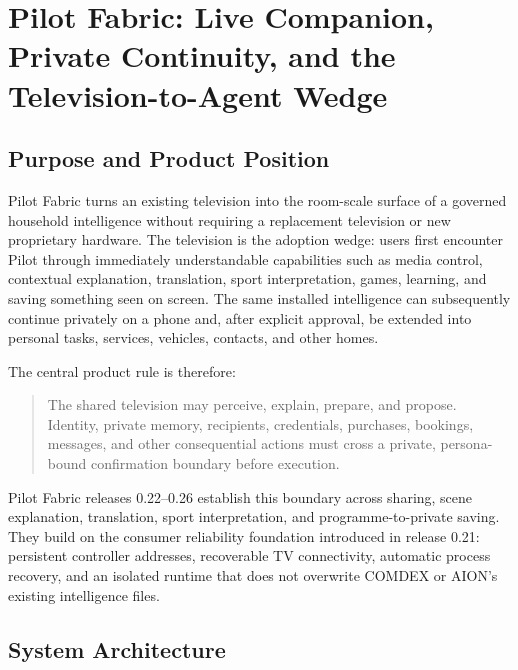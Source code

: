 
\section{Pilot Fabric: Live Companion, Private Continuity, and the Television-to-Agent Wedge}
\label{sec:pilot-live-companion-private-continuity}

\subsection{Purpose and Product Position}

Pilot Fabric turns an existing television into the room-scale surface of a
governed household intelligence without requiring a replacement television or
new proprietary hardware.  The television is the adoption wedge: users first
encounter Pilot through immediately understandable capabilities such as media
control, contextual explanation, translation, sport interpretation, games,
learning, and saving something seen on screen.  The same installed intelligence
can subsequently continue privately on a phone and, after explicit approval,
be extended into personal tasks, services, vehicles, contacts, and other homes.

The central product rule is therefore:

\begin{quote}
The shared television may perceive, explain, prepare, and propose.  Identity,
private memory, recipients, credentials, purchases, bookings, messages, and
other consequential actions must cross a private, persona-bound confirmation
boundary before execution.
\end{quote}

Pilot Fabric releases 0.22--0.26 establish this boundary across sharing, scene
explanation, translation, sport interpretation, and programme-to-private
saving.  They build on the consumer reliability foundation introduced in
release 0.21: persistent controller addresses, recoverable TV connectivity,
automatic process recovery, and an isolated runtime that does not overwrite
COMDEX or AION's existing intelligence files.

\subsection{System Architecture}

